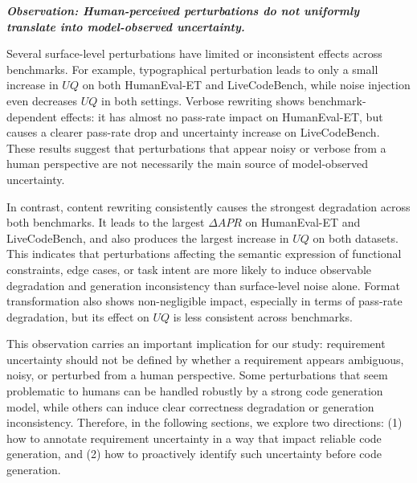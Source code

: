 \begin{ellipsebox}
\centering
\normalfont\itshape
\textbf{Observation: Human-perceived perturbations do not uniformly translate into model-observed uncertainty.}
\end{ellipsebox}

Several surface-level perturbations have limited or inconsistent effects across benchmarks. For example, typographical perturbation leads to only a small increase in $UQ$ on both HumanEval-ET and LiveCodeBench, while noise injection even decreases $UQ$ in both settings. Verbose rewriting shows benchmark-dependent effects: it has almost no pass-rate impact on HumanEval-ET, but causes a clearer pass-rate drop and uncertainty increase on LiveCodeBench. These results suggest that perturbations that appear noisy or verbose from a human perspective are not necessarily the main source of model-observed uncertainty.

In contrast, content rewriting consistently causes the strongest degradation across both benchmarks. It leads to the largest $\Delta APR$ on HumanEval-ET and LiveCodeBench, and also produces the largest increase in $UQ$ on both datasets. This indicates that perturbations affecting the semantic expression of functional constraints, edge cases, or task intent are more likely to induce observable degradation and generation inconsistency than surface-level noise alone. Format transformation also shows non-negligible impact, especially in terms of pass-rate degradation, but its effect on $UQ$ is less consistent across benchmarks.

This observation carries an important implication for our study: requirement uncertainty should not be defined by whether a requirement appears ambiguous, noisy, or perturbed from a human perspective. Some perturbations that seem problematic to humans can be handled robustly by a strong code generation model, while others can induce clear correctness degradation or generation inconsistency. Therefore, in the following sections, we explore two directions: (1) how to annotate requirement uncertainty in a way that impact reliable code generation, and (2) how to proactively identify such uncertainty before code generation.

